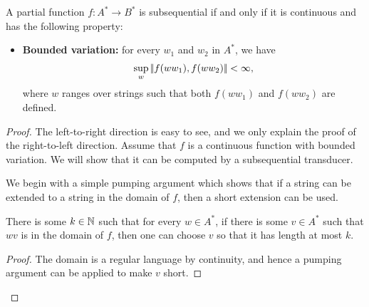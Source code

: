 \begin{theorem}[Choffrut]\label{thm:subsequential-functions}
        A partial function $f : A^* \to B^*$ is subsequential if and only if it is continuous and has the following  property: 
        \begin{itemize}
            \item \textbf{Bounded variation:}  for every $w_1$ and $w_2$ in $A^*$, we have 
            \begin{align*}
            \sup_{w} |\!|  f(ww_1), f(ww_2) |\!| < \infty,
        \end{align*}
        where  $w$ ranges over strings such that both $f(w w_1)$ and $f(ww_2)$ are defined.
        \end{itemize}
\end{theorem}
\begin{proof}
    The left-to-right direction is easy to see, and we only explain the proof of the right-to-left direction. Assume that $f$ is a continuous function with bounded variation. We will show that it can be computed by a subsequential transducer. 
 
    We begin with a simple pumping argument which shows that if a string can be extended to a string in the domain of $f$, then a short extension can be used.
   \begin{claim}\label{claim:bounded-extensions}
    There is some $k \in {\mathbb N}$ such that for every $w \in A^*$, if there is some $v \in A^*$ such that $wv$ is in the domain of $f$, then one can choose $v$ so that it has length at most $k$.
   \end{claim}
   \begin{proof}
    The domain is a regular language by continuity, and hence a pumping argument can be applied to make $v$ short.
   \end{proof}


\end{proof}
